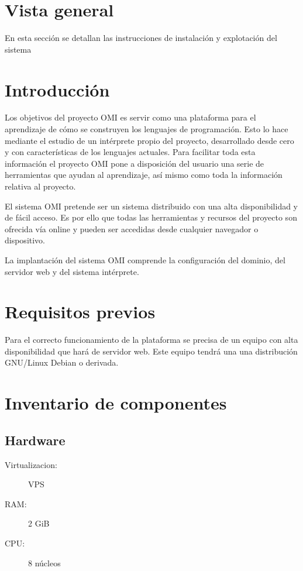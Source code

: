 \section{Vista general}
En esta sección se detallan las instrucciones de instalación y explotación del sistema

\section{Introducción}
Los objetivos del proyecto OMI es servir como una plataforma para el aprendizaje de cómo se 
construyen los lenguajes de programación. Esto lo hace mediante el estudio de un intérprete propio del 
proyecto, desarrollado desde cero y con características de los lenguajes actuales. Para facilitar toda esta información el
proyecto OMI pone a disposición del usuario una serie de herramientas que ayudan al aprendizaje, así mismo como toda la información relativa al proyecto. 

El sistema OMI pretende ser un sistema distribuido con una alta disponibilidad y de fácil acceso. Es por ello que 
todas las herramientas y recursos del proyecto son ofrecida vía online y pueden ser accedidas desde cualquier navegador o dispositivo.

La implantación del sistema OMI comprende la configuración del dominio, del servidor web y del sistema intérprete.
 
\section{Requisitos previos}
Para el correcto funcionamiento de la plataforma se precisa de un equipo con alta disponibilidad que hará de servidor web. Este equipo tendrá una 
una distribución GNU/Linux Debian o derivada.

\section{Inventario de componentes}

\subsection{Hardware}

\begin{description}
\item[Virtualizacion:] VPS
\item[RAM:] 2 GiB
\item[CPU:] 8 núcleos
\end{description} 

